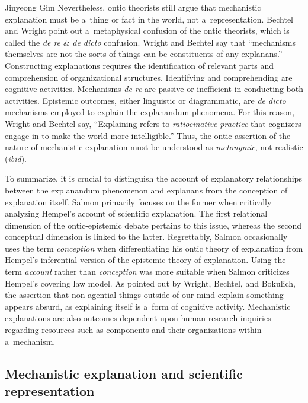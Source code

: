 \begin{artengenv}{Jinyeong Gim}
Nevertheless, ontic theorists still argue that mechanistic explanation must be a~thing or fact in the world, not a~representation. Bechtel and Wright point out a~metaphysical confusion of the ontic theorists, which is called the \textit{de re} \& \textit{de dicto} confusion. Wright and Bechtel
\parencite*[][p.51]{wright_mechanisms_2007} %
 say that ``mechanisms themselves are not the sorts of things can be constituents of any explanans.'' Constructing explanations requires the identification of relevant parts and comprehension of organizational structures. Identifying and comprehending are cognitive activities. Mechanisms \textit{de re} are passive or inefficient in conducting both activities. Epistemic outcomes, either linguistic or diagrammatic, are \textit{de dicto} mechanisms employed to explain the explanandum phenomena. For this reason, Wright and Bechtel 
\parencite*[][p.51]{wright_mechanisms_2007} %
 say, ``Explaining refers to \textit{ratiocinative practice} that cognizers engage in to make the world more intelligible.'' Thus, the ontic assertion of the nature of mechanistic explanation must be understood as \textit{metonymic}, not realistic (\textit{ibid}).

To summarize, it is crucial to distinguish the account of explanatory relationships between the explanandum phenomenon and explanans from the conception of explanation itself. Salmon primarily focuses on the former when critically analyzing Hempel's account of scientific explanation. The first relational dimension of the ontic-epistemic debate pertains to this issue, whereas the second conceptual dimension is linked to the latter. Regrettably, Salmon occasionally uses the term \textit{conception} when differentiating his ontic theory of explanation from Hempel's inferential version of the epistemic theory of explanation. Using the term \textit{account} rather than \textit{conception} was more suitable when Salmon criticizes Hempel's covering law model. As pointed out by Wright, Bechtel, and Bokulich, the assertion that non-agential things outside of our mind explain something appears absurd, as explaining itself is a~form of cognitive activity. Mechanistic explanations are also outcomes dependent upon human research inquiries regarding resources such as components and their organizations within a~mechanism.

\subsection{Mechanistic explanation and scientific representation}


\end{artengenv}
